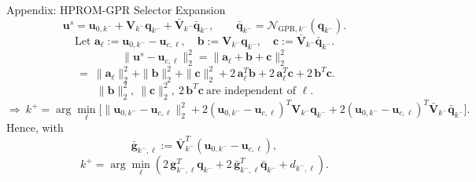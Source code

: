 \documentclass{beamer}
\begin{document}
\begin{frame}{Appendix: HPROM-GPR Selector Expansion}
\scriptsize
\[
\mathbf u^s=
\mathbf u_{0,k^-}
+\mathbf V_{k^-}\mathbf q_{k^-}
+\bar{\mathbf V}_{k^-}\bar{\mathbf q}_{k^-},
\qquad
\bar{\mathbf q}_{k^-}=\mathcal N_{\mathrm{GPR},k^-}(\mathbf q_{k^-}).
\]
\[
\text{Let }\mathbf a_\ell:=\mathbf u_{0,k^-}-\mathbf u_{c,\ell},\quad
\mathbf b:=\mathbf V_{k^-}\mathbf q_{k^-},\quad
\mathbf c:=\bar{\mathbf V}_{k^-}\bar{\mathbf q}_{k^-}.
\]
\[
\|\mathbf u^s-\mathbf u_{c,\ell}\|_2^2
=\|\mathbf a_\ell+\mathbf b+\mathbf c\|_2^2
\]
\[
\ =\ \|\mathbf a_\ell\|_2^2+\|\mathbf b\|_2^2+\|\mathbf c\|_2^2
+2\,\mathbf a_\ell^T\mathbf b
+2\,\mathbf a_\ell^T\mathbf c
+2\,\mathbf b^T\mathbf c.
\]
\[
\|\mathbf b\|_2^2,\ \|\mathbf c\|_2^2,\ 2\,\mathbf b^T\mathbf c
\ \text{are independent of }\ell.
\]
\[
\Rightarrow\
k^+=\arg\min_{\ell}
\Big[
\|\mathbf u_{0,k^-}-\mathbf u_{c,\ell}\|_2^2
+2(\mathbf u_{0,k^-}-\mathbf u_{c,\ell})^T\mathbf V_{k^-}\mathbf q_{k^-}
+2(\mathbf u_{0,k^-}-\mathbf u_{c,\ell})^T\bar{\mathbf V}_{k^-}\bar{\mathbf q}_{k^-}
\Big].
\]
Hence, with
\[
\bar{\mathbf g}_{k^-,\ell}:=\bar{\mathbf V}_{k^-}^T(\mathbf u_{0,k^-}-\mathbf u_{c,\ell}),
\]
\[
k^+=\arg\min_{\ell}
\left(
2\,\mathbf g_{k^-,\ell}^T\mathbf q_{k^-}
+2\,\bar{\mathbf g}_{k^-,\ell}^T\bar{\mathbf q}_{k^-}
+d_{k^-,\ell}
\right).
\]
\end{frame}
\end{document}
